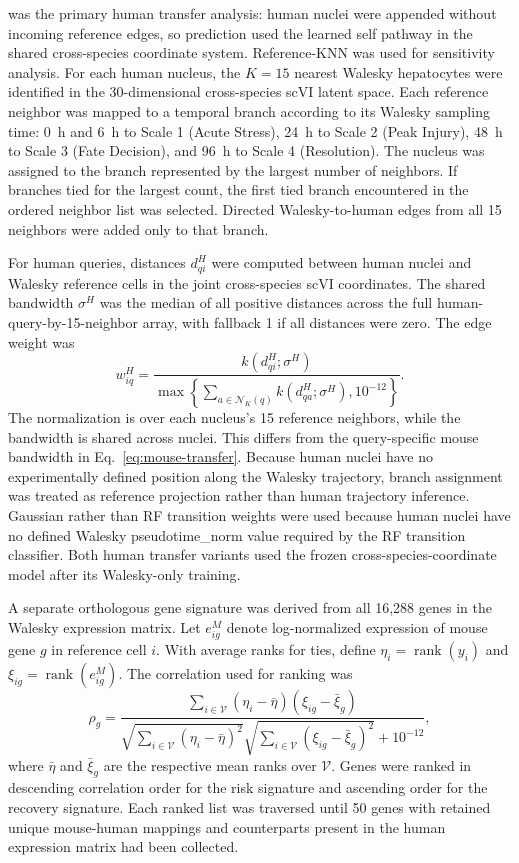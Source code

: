 \SelfOnly{} was the primary human transfer analysis: human nuclei were appended without incoming reference edges, so prediction used the learned self pathway in the shared cross-species coordinate system. Reference-KNN was used for sensitivity analysis. For each human nucleus, the \(K=15\) nearest Walesky hepatocytes were identified in the 30-dimensional cross-species scVI latent space. Each reference neighbor was mapped to a temporal branch according to its Walesky sampling time: 0~h and 6~h to Scale 1 (Acute Stress), 24~h to Scale 2 (Peak Injury), 48~h to Scale 3 (Fate Decision), and 96~h to Scale 4 (Resolution). The nucleus was assigned to the branch represented by the largest number of neighbors. If branches tied for the largest count, the first tied branch encountered in the ordered neighbor list was selected. Directed Walesky-to-human edges from all 15 neighbors were added only to that branch.

For human queries, distances \(d_{qi}^{H}\) were computed between human nuclei and Walesky reference cells in the joint cross-species scVI coordinates. The shared bandwidth \(\sigma^{H}\) was the median of all positive distances across the full human-query-by-15-neighbor array, with fallback 1 if all distances were zero. The edge weight was
\begin{equation}\label{eq:human-transfer}
w_{iq}^{H}=\frac{k(d_{qi}^{H};\sigma^{H})}
{\max\!\left\{\sum_{a\in\mathcal N_K(q)}k(d_{qa}^{H};\sigma^{H}),10^{-12}\right\}}.
\end{equation}
The normalization is over each nucleus's 15 reference neighbors, while the bandwidth is shared across nuclei. This differs from the query-specific mouse bandwidth in Eq.~\eqref{eq:mouse-transfer}. Because human nuclei have no experimentally defined position along the Walesky trajectory, branch assignment was treated as reference projection rather than human trajectory inference. Gaussian rather than RF transition weights were used because human nuclei have no defined Walesky pseudotime\_norm value required by the RF transition classifier. Both human transfer variants used the frozen cross-species-coordinate model after its Walesky-only training.

A separate orthologous gene signature was derived from all 16,288 genes in the Walesky expression matrix. Let \(e_{ig}^{M}\) denote log-normalized expression of mouse gene \(g\) in reference cell \(i\). With average ranks for ties, define \(\eta_i=\operatorname{rank}(y_i)\) and \(\xi_{ig}=\operatorname{rank}(e_{ig}^{M})\). The correlation used for ranking was
\begin{equation}\label{eq:signature-correlation}
\rho_g=
\frac{\sum_{i\in\mathcal V}(\eta_i-\bar\eta)(\xi_{ig}-\bar\xi_g)}
{\sqrt{\sum_{i\in\mathcal V}(\eta_i-\bar\eta)^2}
\sqrt{\sum_{i\in\mathcal V}(\xi_{ig}-\bar\xi_g)^2}+10^{-12}},
\end{equation}
where \(\bar\eta\) and \(\bar\xi_g\) are the respective mean ranks over \(\mathcal V\). Genes were ranked in descending correlation order for the risk signature and ascending order for the recovery signature. Each ranked list was traversed until 50 genes with retained unique mouse-human mappings and counterparts present in the human expression matrix had been collected.

